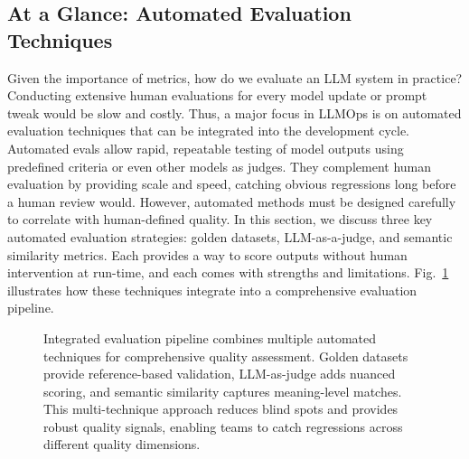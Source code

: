 \subsection*{At a Glance: Automated Evaluation Techniques}
Given the importance of metrics, how do we evaluate an LLM system in practice? Conducting extensive human evaluations for every model update or prompt tweak would be slow and costly. Thus, a major focus in LLMOps is on automated evaluation techniques that can be integrated into the development cycle. Automated evals allow rapid, repeatable testing of model outputs using predefined criteria or even other models as judges. They complement human evaluation by providing scale and speed, catching obvious regressions long before a human review would. However, automated methods must be designed carefully to correlate with human-defined quality. In this section, we discuss three key automated evaluation strategies: golden datasets, LLM-as-a-judge, and semantic similarity metrics. Each provides a way to score outputs without human intervention at run-time, and each comes with strengths and limitations.
Fig.~\ref{fig:ch10_eval_pipeline_flow} illustrates how these techniques integrate into a comprehensive evaluation pipeline.

\begin{figure}[t]
\centering
\begin{llmfigbox}
\end{llmfigbox}
\caption{Integrated evaluation pipeline combines multiple automated techniques for comprehensive quality assessment. Golden datasets provide reference-based validation, LLM-as-judge adds nuanced scoring, and semantic similarity captures meaning-level matches. This multi-technique approach reduces blind spots and provides robust quality signals, enabling teams to catch regressions across different quality dimensions.}
\label{fig:ch10_eval_pipeline_flow}
\end{figure}

